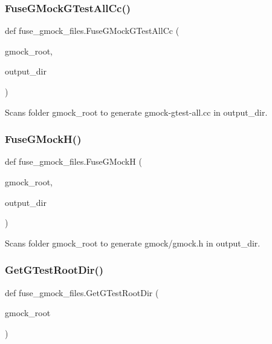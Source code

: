 \subsubsection{\texorpdfstring{FuseGMockGTestAllCc()}{FuseGMockGTestAllCc()}}
{\footnotesize\ttfamily def fuse\+\_\+gmock\+\_\+files.\+Fuse\+G\+Mock\+G\+Test\+All\+Cc (\begin{DoxyParamCaption}\item[{}]{gmock\+\_\+root,  }\item[{}]{output\+\_\+dir }\end{DoxyParamCaption})}

\begin{DoxyVerb}Scans folder gmock_root to generate gmock-gtest-all.cc in output_dir.\end{DoxyVerb}
 \mbox{\label{namespacefuse__gmock__files_abab451606f671f59404f23276aad2c34}} 
\subsubsection{\texorpdfstring{FuseGMockH()}{FuseGMockH()}}
{\footnotesize\ttfamily def fuse\+\_\+gmock\+\_\+files.\+Fuse\+G\+MockH (\begin{DoxyParamCaption}\item[{}]{gmock\+\_\+root,  }\item[{}]{output\+\_\+dir }\end{DoxyParamCaption})}

\begin{DoxyVerb}Scans folder gmock_root to generate gmock/gmock.h in output_dir.\end{DoxyVerb}
 \mbox{\label{namespacefuse__gmock__files_aae591d77d2d969394996f9fc2017824c}} 
\subsubsection{\texorpdfstring{GetGTestRootDir()}{GetGTestRootDir()}}
{\footnotesize\ttfamily def fuse\+\_\+gmock\+\_\+files.\+Get\+G\+Test\+Root\+Dir (\begin{DoxyParamCaption}\item[{}]{gmock\+\_\+root }\end{DoxyParamCaption})}

